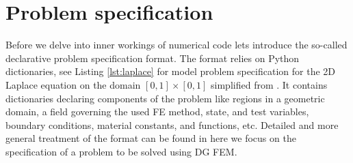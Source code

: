 \section{Problem specification}
\label{se:problem_spec}
Before we delve into inner workings of \sfepy{} numerical code lets
introduce the so-called declarative problem specification format. The format relies on
Python dictionaries, see Listing \ref{lst:laplace} for model problem specification for the 2D
Laplace equation on the domain $[0, 1] \times [0, 1]$ simplified from . It
contains dictionaries declaring components of the problem like regions in a geometric
domain, a field governing the used FE method, state, and test variables, boundary
conditions, material constants, and functions, etc. Detailed and more general treatment
of the format can be found in \cite{Cimrman_Lukes_Rohan_2019} here we focus on the
specification of a problem to be solved using DG FEM.

